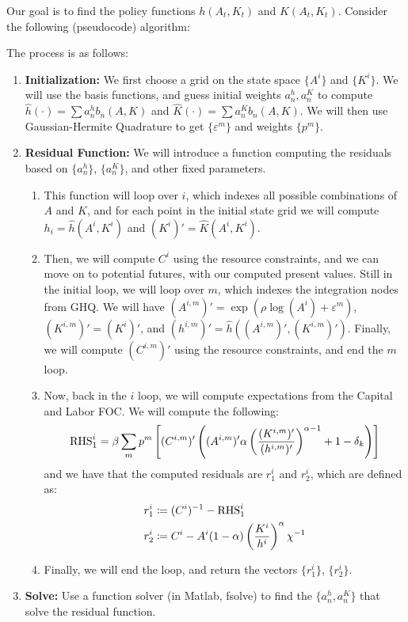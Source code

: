 \documentclass[10pt]{article}
\begin{document}
Our goal is to find the policy functions $h(A_t,K_t)$ and $K(A_t,K_t)$. Consider the following (pseudocode) algorithm:
\begin{algorithm} The process is as follows:
	\begin{enumerate}
		\item \textbf{Initialization:} We first choose a grid on the state space $\{A^i\}$ and $\{K^i\}$. We will use the basis functions, and guess initial weights $a_n^h, a_n^K$ to compute $\hat{h}(\cdot) = \sum a_n^h b_n(A,K)$ and $\hat{K}(\cdot) = \sum a_n^K b_n(A,K)$. We will then use Gaussian-Hermite Quadrature to get $\{\varepsilon^m\}$ and weights $\{p^m\}$.
		\item \textbf{Residual Function:} We will introduce a function computing the residuals based on $\{a_n^h\}$, $\{a_n^K\}$, and other fixed parameters. 
		\begin{enumerate}
			\item This function will loop over $i$, which indexes all possible combinations of $A$ and $K$, and for each point in the initial state grid we will compute $h_i = \hat{h}(A^i,K^i)$ and $(K^{i})' = \hat{K}(A^i,K^i)$. 
			\item Then, we will compute $C^i$ using the resource constraints, and we can move on to potential futures, with our computed present values. Still in the initial loop, we will loop over $m$, which indexes the integration nodes from GHQ. We will have $(A^{i,m})' = \exp(\rho \log(A^i) + \varepsilon^m)$, $(K^{i,m})' = (K^i)'$, and $(h^{i,m})' = \hat{h}((A^{i,m})',(K^{i,m})')$. Finally, we will compute $(C^{i,m})'$ using the resource constraints, and end the $m$ loop.
			\item Now, back in the $i$ loop, we will compute expectations from the Capital and Labor FOC. We will compute the following:
			\[
			\text{RHS}^i_1 = \beta \sum_m p^m \left[ (C^{i,m})' \left( (A^{i,m})' \alpha \left( \frac{(K^{i,m})'}{(h^{i,m})'}\right)^{\alpha - 1} + 1-\delta_k\right) \right] 
			\]
			and we have that the computed residuals are $r_1^i$ and $r_2^i$, which are defined as:
			\begin{align*}
				r_1^i &\coloneqq (C^i)^{-1} - \text{RHS}_1^i \\
				r_2^i &\coloneqq C^i - A^i (1-\alpha) \left( \frac{K^i}{h^i}\right)^\alpha \chi^{-1}
			\end{align*}
			\item Finally, we will end the loop, and return the vectors $\{r_1^i\}$, $\{r_2^i\}$.
		\end{enumerate}
		\item \textbf{Solve:} Use a function solver (in Matlab, fsolve) to find the $\{a_n^h,a_n^K\}$ that solve the residual function.
	\end{enumerate}
\end{algorithm}
\end{document}
